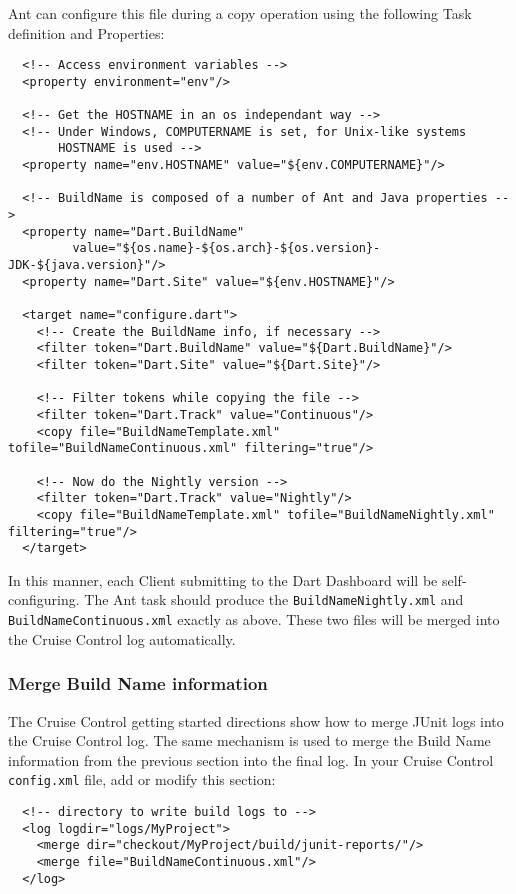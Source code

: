 \documentclass{InsightBook}
\newcommand{\filename}[1]{\texttt{#1}}
\begin{document}
Ant can configure this file during a copy operation using the
following Task definition and Properties:
\begin{verbatim}
  <!-- Access environment variables -->
  <property environment="env"/>

  <!-- Get the HOSTNAME in an os independant way -->
  <!-- Under Windows, COMPUTERNAME is set, for Unix-like systems
       HOSTNAME is used -->
  <property name="env.HOSTNAME" value="${env.COMPUTERNAME}"/>

  <!-- BuildName is composed of a number of Ant and Java properties -->
  <property name="Dart.BuildName" 
         value="${os.name}-${os.arch}-${os.version}-JDK-${java.version}"/>
  <property name="Dart.Site" value="${env.HOSTNAME}"/>

  <target name="configure.dart">
    <!-- Create the BuildName info, if necessary -->
    <filter token="Dart.BuildName" value="${Dart.BuildName}"/>
    <filter token="Dart.Site" value="${Dart.Site}"/>

    <!-- Filter tokens while copying the file -->
    <filter token="Dart.Track" value="Continuous"/>
    <copy file="BuildNameTemplate.xml" tofile="BuildNameContinuous.xml" filtering="true"/>

    <!-- Now do the Nightly version -->
    <filter token="Dart.Track" value="Nightly"/>
    <copy file="BuildNameTemplate.xml" tofile="BuildNameNightly.xml" filtering="true"/>
  </target>
\end{verbatim}

  In this manner, each Client submitting to the Dart Dashboard will be
self-configuring.  The Ant task should produce the
\filename{BuildNameNightly.xml} and \filename{BuildNameContinuous.xml}
exactly as above.  These two files will be merged into the Cruise
Control log automatically.

\subsubsection{Merge Build Name information}
The Cruise Control getting started directions show how to merge JUnit
logs into the Cruise Control log.  The same mechanism is used to merge
the Build Name information from the previous section into the final
log.  In your Cruise Control \filename{config.xml} file, add or modify
this section:
\begin{verbatim}
  <!-- directory to write build logs to -->
  <log logdir="logs/MyProject">
    <merge dir="checkout/MyProject/build/junit-reports/"/>
    <merge file="BuildNameContinuous.xml"/>
  </log>
\end{verbatim}
\end{document}
